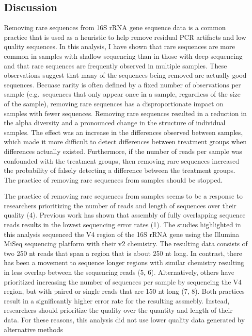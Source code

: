\documentclass[
]{article}
\begin{document}
\hypertarget{discussion}{%
\subsection{Discussion}\label{discussion}}

Removing rare sequences from 16S rRNA gene sequence data is a common
practice that is used as a heuristic to help remove residual PCR
artifacts and low quality sequences. In this analysis, I have shown that
rare sequences are more common in samples with shallow sequencing than
in those with deep sequencing and that rare sequences are frequently
observed in multiple samples. These observations suggest that many of
the sequences being removed are actually good sequences. Becuase rarity
is often defined by a fixed number of observations per sample
(e.g.~sequences that only appear once in a sample, regardless of the
size of the sample), removing rare sequences has a disproportionate
impact on samples with fewer sequences. Removing rare sequences resulted
in a reduction in the alpha diversity and a pronounced change in the
structure of individual samples. The effect was an increase in the
differences observed between samples, which made it more difficult to
detect differences between treatment groups when differences actually
existed. Furthermore, if the number of reads per sample was confounded
with the treatment groups, then removing rare sequences increased the
probability of falsely detecting a difference between the treatment
groups. The practice of removing rare sequences from samples should be
stopped.

The practice of removing rare sequences from samples seems to be a
response to researchers prioritizing the number of reads and length of
sequences over their quality (4). Previous work has shown that assembly
of fully overlapping sequence reads results in the lowest sequencing
error rates (1). The studies highlighted in this analysis sequenced the
V4 region of the 16S rRNA gene using the Illumina MiSeq sequencing
platform with their v2 chemistry. The resulting data consists of two 250
nt reads that span a region that is about 250 nt long. In contrast,
there has been a movement to sequence longer regions with similar
chemistry resulting in less overlap between the sequencing reads (5, 6).
Alternatively, others have prioritized increasing the number of
sequences per sample by sequencing the V4 region, but with paired or
single reads that are 150 nt long (7, 8). Both practices result in a
significantly higher error rate for the resulting assmebly. Instead,
researchers should prioritize the quality over the quantity and length
of their data. For these reasons, this analysis did not use lower
quality data generated by alternative methods
\end{document}
